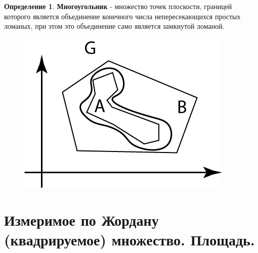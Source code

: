 \documentclass{report}
\theoremstyle{definition}
\newtheorem*{definition}{Определение}
\begin{document}
\begin{definition}
    \textbf{Многоугольник} - множество точек плоскости, границей которого является объединение конечного
    числа непересекающихся простых ломаных, при этом это объединение само является замкнутой ломаной.
    \begin{figure}[H]
        \begin{center}
            \includegraphics[scale=0.3]{graph17.png}\label{figure17}
        \end{center}
    \end{figure}
\end{definition}

\section{Измеримое по Жордану (квадрируемое) множество. Площадь.}
\end{document}

